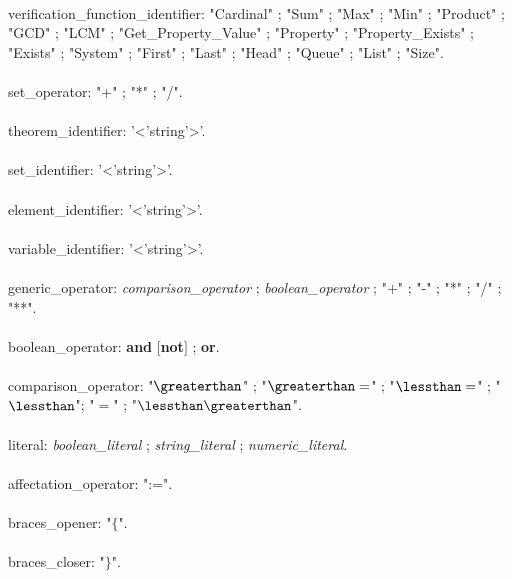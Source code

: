 {\begin{grammar}
\\
verification\_function\_identifier: "Cardinal" ; "Sum" ; "Max" ;
"Min" ; "Product" ; "GCD" ; "LCM" ; "Get\_Property\_Value" ; 
"Property" ; "Property\_Exists" ; "Exists" ; "System" ; "First" ; 
"Last" ; "Head" ; "Queue" ; "List" ; "Size".\\
\\
set\_operator: "+" ; "*" ; "/".\\
\\
theorem\_identifier: '<'string'>'.\\
\\
set\_identifier: '<'string'>'.\\
\\
element\_identifier: '<'string'>'.\\
\\
variable\_identifier: '<'string'>'.\\
\\
generic\_operator: \textit{comparison\_operator} ;
\textit{boolean\_operator} ; "+" ; "-" ; "*" ; "/" ; "**".\\
\\
boolean\_operator: \textbf {and} $[$\textbf {not}$]$ ; \textbf {or}.\\
\\
comparison\_operator: "$\greaterthan$" ; "$\greaterthan=$" ;
"$\lessthan=$" ; "$\lessthan$"; "$=$" ; "$\lessthan\greaterthan$".\\
\\
literal: \textit{boolean\_literal} ; \textit{string\_literal} ;
\textit{numeric\_literal}.\\
\\
affectation\_operator: ":=".\\
\\
braces\_opener: "\textbf{$\{$}".\\
\\
braces\_closer: "\textbf{$\}$}".\\

\end{grammar}
}
